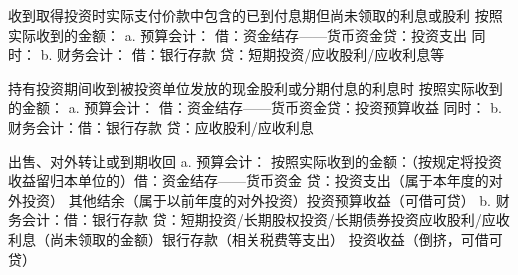 \documentclass[UTF8,12pt]{ctexart}
\numberwithin{equation}{section} %
\numberwithin{figure}{section}
\numberwithin{table}{section}
\begin{document}
	收到取得投资时实际支付价款中包含的已到付息期但尚未领取的利息或股利
	按照实际收到的金额：
	a.	预算会计：
	借：资金结存——货币资金贷：投资支出
	同时：
	b.	财务会计：
	借：银行存款
	贷：短期投资/应收股利/应收利息等
	
	持有投资期间收到被投资单位发放的现金股利或分期付息的利息时
	按照实际收到的金额：
	a.	预算会计：
	借：资金结存——货币资金贷：投资预算收益
	同时：
	b.	财务会计：借：银行存款
	贷：应收股利/应收利息
	
	出售、对外转让或到期收回
	a.	预算会计：
	按照实际收到的金额：（按规定将投资收益留归本单位的）借：资金结存——货币资金
	贷：投资支出（属于本年度的对外投资） 其他结余（属于以前年度的对外投资）投资预算收益（可借可贷）
	b.	财务会计：借：银行存款
	贷：短期投资/长期股权投资/长期债券投资应收股利/应收利息（尚未领取的金额）银行存款（相关税费等支出）
	投资收益（倒挤，可借可贷）
	
\end{document}
